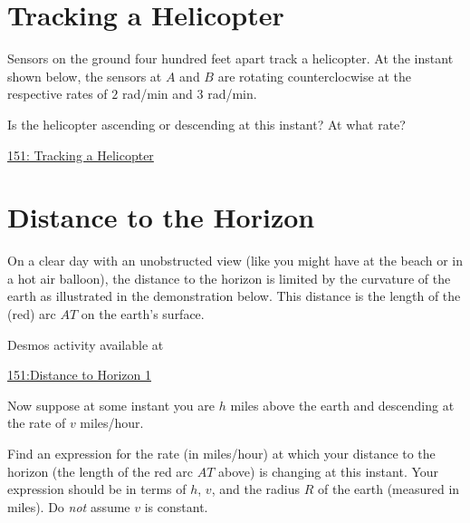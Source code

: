 \documentclass{ximera}
\begin{document}
\section{Tracking a Helicopter}
Sensors on the ground four hundred feet apart track a helicopter. At the instant shown below, the sensors at $A$ and $B$ are rotating counterclocwise at the respective rates of $2$ rad/min and $3$ rad/min.

Is the helicopter ascending or descending at this instant? At what rate?

 
\begin{onlineOnly}
   \begin{center}
\end{center}
\end{onlineOnly}

\href{https://www.desmos.com/calculator/xl8t3toppg}{151: Tracking a Helicopter}



\section{Distance to the Horizon}

\begin{question}  \label{Qthhvhrdfgbyt}
On a clear day with an unobstructed view (like you might have at the beach or in a hot air balloon), the distance to the horizon is limited by the curvature of the earth as illustrated in the demonstration below. This distance is the length of the (red) arc $AT$ on the earth's surface. 


 
\begin{onlineOnly}
    \begin{center}
\end{center}
\end{onlineOnly}

Desmos activity available at

\href{https://www.desmos.com/calculator/ewowig5sgk}{151:Distance to Horizon 1}

Now suppose at some instant you are $h$ miles above the earth and descending at the rate of $v$ miles/hour. 

Find an expression for the rate (in miles/hour) at which your distance to the horizon (the length of the red arc $AT$ above) is changing at this instant. Your expression should be in terms of $h$, $v$, and the radius $R$ of the earth (measured in miles). Do \emph{not} assume $v$ is constant.

\end{question}
\end{document}
